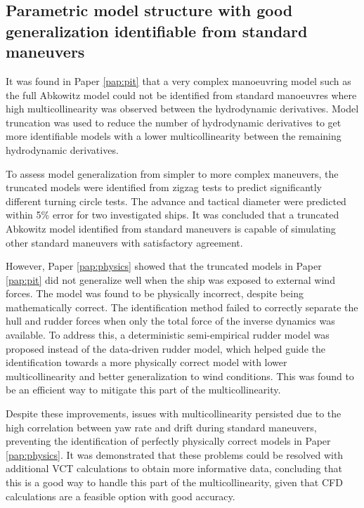 \subsection*{Parametric model structure with good generalization identifiable from standard maneuvers}
It was found in Paper \ref{pap:pit} that a very complex manoeuvring model such as the full Abkowitz model could not be identified from standard manoeuvres where high multicollinearity was observed between the hydrodynamic derivatives.  Model truncation was used to reduce the number of hydrodynamic derivatives to get more identifiable models with a lower multicollinearity between the remaining hydrodynamic derivatives.

To assess model generalization from simpler to more complex maneuvers, the truncated models were identified from zigzag tests to predict significantly different turning circle tests. The advance and tactical diameter were predicted within 5\% error for two investigated ships. It was concluded that a truncated Abkowitz model identified from standard maneuvers is capable of simulating other standard maneuvers with satisfactory agreement.

However, Paper \ref{pap:physics} showed that the truncated models in Paper \ref{pap:pit} did not generalize well when the ship was exposed to external wind forces. The model was found to be physically incorrect, despite being mathematically correct. The identification method failed to correctly separate the hull and rudder forces when only the total force of the inverse dynamics was available. To address this, a deterministic semi-empirical rudder model was proposed instead of the data-driven rudder model, which helped guide the identification towards a more physically correct model with lower multicollinearity and better generalization to wind conditions. This was found to be an efficient way to mitigate this part of the multicollinearity.

Despite these improvements, issues with multicollinearity persisted due to the high correlation between yaw rate and drift during standard maneuvers, preventing the identification of perfectly physically correct models in Paper \ref{pap:physics}. It was demonstrated that these problems could be resolved with additional VCT calculations to obtain more informative data, concluding that this is a good way to handle this part of the multicollinearity, given that CFD calculations are a feasible option with good accuracy.

